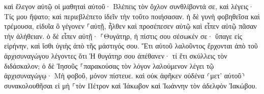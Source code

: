 \documentclass{openreader}
\begin{document}
καὶ ἔλεγον αὐτῷ οἱ μαθηταὶ αὐτοῦ· Βλέπεις τὸν ὄχλον συνθλίβοντά σε, καὶ λέγεις· Τίς μου ἥψατο; 
καὶ περιεβλέπετο ἰδεῖν τὴν τοῦτο ποιήσασαν. 
ἡ δὲ γυνὴ φοβηθεῖσα καὶ τρέμουσα, εἰδυῖα ὃ γέγονεν ⸀αὐτῇ, ἦλθεν καὶ προσέπεσεν αὐτῷ καὶ εἶπεν αὐτῷ πᾶσαν τὴν ἀλήθειαν. 
ὁ δὲ εἶπεν αὐτῇ· ⸀Θυγάτηρ, ἡ πίστις σου σέσωκέν σε· ὕπαγε εἰς εἰρήνην, καὶ ἴσθι ὑγιὴς ἀπὸ τῆς μάστιγός σου. 
Ἔτι αὐτοῦ λαλοῦντος ἔρχονται ἀπὸ τοῦ ἀρχισυναγώγου λέγοντες ὅτι Ἡ θυγάτηρ σου ἀπέθανεν· τί ἔτι σκύλλεις τὸν διδάσκαλον; 
ὁ δὲ Ἰησοῦς ⸀παρακούσας τὸν λόγον λαλούμενον λέγει τῷ ἀρχισυναγώγῳ· Μὴ φοβοῦ, μόνον πίστευε. 
καὶ οὐκ ἀφῆκεν οὐδένα ⸂μετ’ αὐτοῦ⸃ συνακολουθῆσαι εἰ μὴ ⸀τὸν Πέτρον καὶ Ἰάκωβον καὶ Ἰωάννην τὸν ἀδελφὸν Ἰακώβου. 
\end{document}
